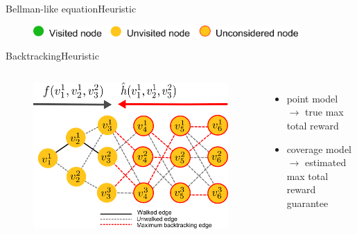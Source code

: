 \begin{frame}{Bellman-like equation}{Heuristic}
	\begin{figure}
		\centering
		\includegraphics[width = 0.9\textwidth]{./figure/DefineFuncHelp}
	\end{figure}
	
\end{frame}

\begin{frame}{Backtracking}{Heuristic}
	
	\begin{columns}
		
		\begin{minipage}{\textwidth}
			\begin{figure}
				\centering
				\includegraphics[width = \textwidth]{./figure/backtracking}
			\end{figure}
		\end{minipage}
		
		\begin{minipage}{\textwidth}
			\begin{itemize}
				\item point model $ \rightarrow $ true max total reward
				\item coverage model $ \rightarrow $ estimated max total reward guarantee
			\end{itemize}
		\end{minipage}
		
	\end{columns}
	
\end{frame}


